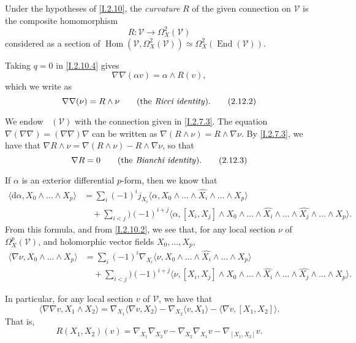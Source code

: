 \documentclass{report}
\theoremstyle{plain}
\theoremstyle{definition}
\newenvironment{definition}[1]
    {\renewcommand\theinnercustomdefinition{#1}\innercustomdefinition}
    {\endinnercustomdefinition}
\newenvironment{env}[1]
    {\renewcommand\theinnercustomenv{#1}\innercustomenv}
    {\endinnercustomenv}
\newcommand{\sh}{\mathscr}
\newcommand{\dd}{\mathrm{d}}
\DeclareMathOperator{\Hom}{Hom}
\DeclareMathOperator{\End}{End}
\DeclareMathOperator{\shEnd}{\underline{End}}
\newcommand{\oldpage}[1]{\marginpar{\footnotesize$\Big\vert$ \textit{p.~#1}}}
\begin{document}
\begin{definition}{2.11}
\label{I.2.11}
  Under the hypotheses of \cref{I.2.10}, the \emph{curvature} $R$ of the given connection on $\sh{V}$ is the composite homomorphism
  \[
    R\colon \sh{V} \to \Omega_X^2(\sh{V})
  \]
  considered as a section of $\Hom(\sh{V},\Omega_X^2(\sh{V})) \simeq \Omega_X^2(\End(\sh{V}))$.
\end{definition}

\begin{env}{2.12}
\label{I.2.12}
  Taking $q=0$ in \cref{I.2.10.4} gives
  \[
  \label{I.2.12.1}
    \nabla\nabla(\alpha v) = \alpha\wedge R(v),
  \tag{2.12.1}
  \]
  which we write as
\oldpage{11}
  \[
  \label{I.2.12.2}
    \nabla\nabla(\nu) = R\wedge\nu
    \qquad\mbox{(the \emph{Ricci identity}).}
  \tag{2.12.2}
  \]

  We endow $\shEnd(\sh{V})$ with the connection given in \cref{I.2.7.3}.
  The equation $\nabla(\nabla\nabla)=(\nabla\nabla)\nabla$ can be written as $\nabla(R\wedge\nu) = R\wedge\nabla\nu$.
  By \cref{I.2.7.3}, we have that $\nabla R\wedge\nu = \nabla(R\wedge\nu) - R\wedge\nabla\nu$, so that
  \[
  \label{I.2.12.3}
    \nabla R=0
    \qquad\mbox{(the \emph{Bianchi identity}).}
  \tag{2.12.3}
  \]
\end{env}

\begin{env}{2.13}
\label{I.2.13}
  If $\alpha$ is an exterior differential $p$-form, then we know that
  \[
    \begin{aligned}
      \langle \dd\alpha, X_0\wedge\ldots\wedge X_p \rangle
      &= \sum_i(-1)^i j_{X_i}\langle \alpha, X_0\wedge\ldots\wedge\widehat{X_i}\wedge\ldots\wedge X_p \rangle
    \\&\quad+ \sum_{i<j})(-1)^{i+j} \langle \alpha, [X_i,X_j]\wedge X_0\wedge\ldots\wedge\widehat{X_i}\wedge\ldots\wedge\widehat{X_j}\wedge\ldots\wedge X_p \rangle.
    \end{aligned}
  \]
  From this formula, and from \cref{I.2.10.2}, we see that, for any local section $\nu$ of $\Omega_X^p(\sh{V})$, and holomorphic vector fields $X_0,\ldots,X_p$,
  \[
  \label{I.2.13.1}
    \begin{aligned}
      \langle \nabla\nu, X_0\wedge\ldots\wedge X_p \rangle
      &= \sum_i(-1)^i \nabla_{X_i}\langle \nu, X_0\wedge\ldots\wedge\widehat{X_i}\wedge\ldots\wedge X_p \rangle
    \\&\quad+ \sum_{i<j})(-1)^{i+j} \langle \nu, [X_i,X_j]\wedge X_0\wedge\ldots\wedge\widehat{X_i}\wedge\ldots\wedge\widehat{X_j}\wedge\ldots\wedge X_p \rangle.
    \end{aligned}
  \tag{2.13.1}
  \]

  In particular, for any local section $v$ of $\sh{V}$, we have that
  \[
    \langle \nabla\nabla v, X_1\wedge X_2 \rangle
    = \nabla_{X_1}\langle \nabla v, X_2 \rangle - \nabla_{X_2}\langle v, X_1 \rangle - \langle \nabla v, [X_1,X_2] \rangle.
  \]
  That is,
  \[
  \label{I.2.13.2}
    R(X_1,X_2)(v) = \nabla_{X_1}\nabla_{X_2}v - \nabla_{X_2}\nabla_{X_1}v - \nabla_{[X_1,X_2]}v.
  \tag{2.13.2}
  \]
\end{env}
\end{document}

